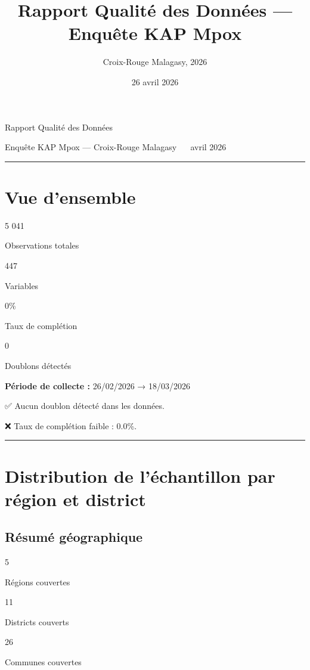 \documentclass[
]{article}
\title{Rapport Qualité des Données --- Enquête KAP Mpox}
\subtitle{Croix-Rouge Malagasy, 2026}
\author{}
\date{\vspace{-2.5em}26 avril 2026}
\begin{document}
\maketitle

{
\setcounter{tocdepth}{2}
\tableofcontents
}
Rapport Qualité des Données

Enquête KAP Mpox --- Croix-Rouge Malagasy ~\textbar~ avril 2026

\begin{center}\rule{0.5\linewidth}{0.5pt}\end{center}

\section{Vue d'ensemble}\label{overview}

5 041

Observations totales

447

Variables

0\%

Taux de complétion

0

Doublons détectés

\textbf{Période de collecte :} 26/02/2026 → 18/03/2026

✅ Aucun doublon détecté dans les données.

❌ Taux de complétion faible : 0.0\%.

\begin{center}\rule{0.5\linewidth}{0.5pt}\end{center}

\section{Distribution de l'échantillon par région et
district}\label{distribution-de-luxe9chantillon-par-ruxe9gion-et-district}

\subsection{Résumé géographique}\label{ruxe9sumuxe9-guxe9ographique}

5

Régions couvertes

11

Districts couverts

26

Communes couvertes
\end{document}
